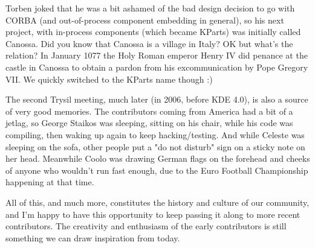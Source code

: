 Torben joked that he was a bit ashamed of the bad design decision to go with CORBA (and out-of-process component embedding in general), so his next project, with in-process components (which became KParts) was initially called Canossa. Did you know that Canossa is a village in Italy? OK but what's the relation? In January 1077 the Holy Roman emperor Henry IV did penance at the castle in Canossa to obtain a pardon from his excommunication by Pope Gregory VII. We quickly switched to the KParts name though :)

The second Trysil meeting, much later (in 2006, before KDE 4.0), is also a source of very good memories. The contributors coming from America had a bit of a jetlag, so George Staikos was sleeping, sitting on his chair, while his code was compiling, then waking up again to keep hacking/testing. And while Celeste was sleeping on the sofa, other people put a "do not disturb" sign on a sticky note on her head. Meanwhile Coolo was drawing German flags on the forehead and cheeks of anyone who wouldn't run fast enough, due to the Euro Football Championship happening at that time.

All of this, and much more, constitutes the history and culture of our community, and I'm happy to have this opportunity to keep passing it along to more recent contributors. The creativity and enthusiasm of the early contributors is still something we can draw inspiration from today.
